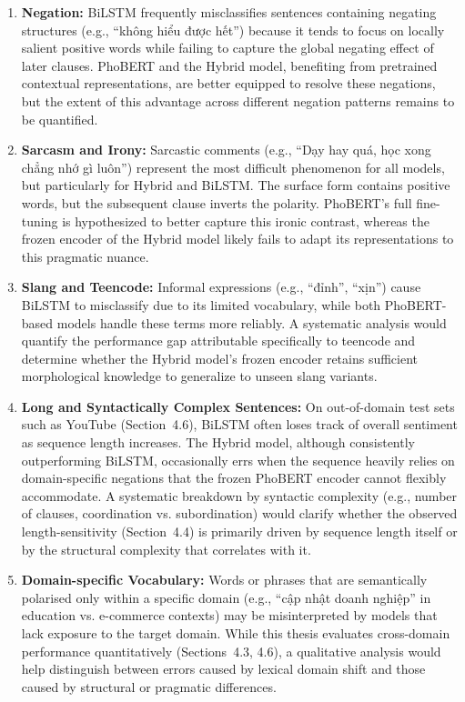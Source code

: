 \documentclass[12pt]{report} %
\begin{document}
\begin{enumerate}
    \item \textbf{Negation:} BiLSTM frequently misclassifies sentences containing negating structures (e.g., \foreignlanguage{vietnamese}{``không hiểu được hết''}) because it tends to focus on locally salient positive words while failing to capture the global negating effect of later clauses. PhoBERT and the Hybrid model, benefiting from pretrained contextual representations, are better equipped to resolve these negations, but the extent of this advantage across different negation patterns remains to be quantified.

    \item \textbf{Sarcasm and Irony:} Sarcastic comments (e.g., \foreignlanguage{vietnamese}{``Dạy hay quá, học xong chẳng nhớ gì luôn''}) represent the most difficult phenomenon for all models, but particularly for Hybrid and BiLSTM. The surface form contains positive words, but the subsequent clause inverts the polarity. PhoBERT's full fine-tuning is hypothesized to better capture this ironic contrast, whereas the frozen encoder of the Hybrid model likely fails to adapt its representations to this pragmatic nuance.

    \item \textbf{Slang and Teencode:} Informal expressions (e.g., \foreignlanguage{vietnamese}{``đỉnh''}, \foreignlanguage{vietnamese}{``xịn''}) cause BiLSTM to misclassify due to its limited vocabulary, while both PhoBERT-based models handle these terms more reliably. A systematic analysis would quantify the performance gap attributable specifically to teencode and determine whether the Hybrid model's frozen encoder retains sufficient morphological knowledge to generalize to unseen slang variants.

    \item \textbf{Long and Syntactically Complex Sentences:} On out-of-domain test sets such as YouTube (Section~4.6), BiLSTM often loses track of overall sentiment as sequence length increases. The Hybrid model, although consistently outperforming BiLSTM, occasionally errs when the sequence heavily relies on domain-specific negations that the frozen PhoBERT encoder cannot flexibly accommodate. A systematic breakdown by syntactic complexity (e.g., number of clauses, coordination vs. subordination) would clarify whether the observed length-sensitivity (Section~4.4) is primarily driven by sequence length itself or by the structural complexity that correlates with it.

    \item \textbf{Domain-specific Vocabulary:} Words or phrases that are semantically polarised only within a specific domain (e.g., \foreignlanguage{vietnamese}{``cập nhật doanh nghiệp''} in education vs. e-commerce contexts) may be misinterpreted by models that lack exposure to the target domain. While this thesis evaluates cross-domain performance quantitatively (Sections~4.3, 4.6), a qualitative analysis would help distinguish between errors caused by lexical domain shift and those caused by structural or pragmatic differences.
\end{enumerate}
\end{document}
